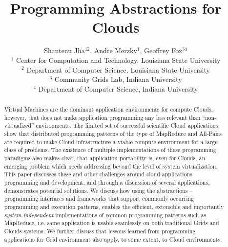 \documentclass{article}
\begin{document}
\title{\large Programming Abstractions for Clouds}

\author{Shantenu Jha$^{12}$,
        Andre Merzky$^{1}$,
        Geoffrey Fox$^{34}$\\[1em]
        $^1$ \small
          Center for Computation and Technology, 
          Louisiana State University\\[-0.3em]
        $^2$ \small
          Department of Computer Science, 
          Louisiana State University\\[-0.3em]
        $^3$ \small
          Community Grids Lab, 
          Indiana University\\[-0.3em]
        $^4$ \small
          Department of Computer Science, 
          Indiana University
       }

\maketitle

\begin{abstract}

  \noindent


  Virtual Machines are the dominant application environments for
  compute Clouds, however, that does not make application programming
  any less relevant than ``non-virtualized'' environments.  The
  limited set of successful scientific Cloud applications show that
  distributed programming patterns of the type of
  MapReduce and All-Pairs are
  required %
  to make Cloud infrastructure a viable compute environment for a
  large class of problems.  The existence of multiple implementations
  of these programming paradigms also makes clear, that application
  portability is, even for Clouds, an emerging problem which needs
  addressing beyond the level of system virtualization. %
  This paper discusses these and other challenges around cloud
  applications programming and development, and through a discussion
  of several applications, demonstrates potential solutions. We
  discuss how using the abstractions -- programming interfaces and
  frameworks that support commonly occurring programming and execution
  patterns, enables the efficient, extensible and importantly {\it
    system-independent} implementations of common programming patterns
  such as MapReduce, i.e. same application is usable seamlessly on
  both traditional Grids and Clouds systems. We further discuss that
  lessons learned from programming applications for Grid environment
  also apply, to some extent, to Cloud environments.

\end{abstract}
\end{document}
